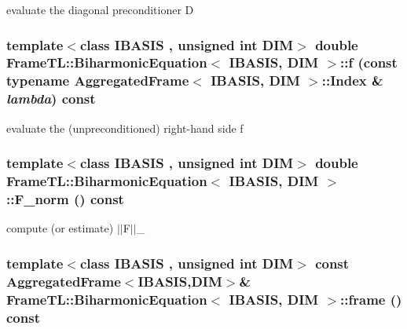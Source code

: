 evaluate the diagonal preconditioner D \hypertarget{classFrameTL_1_1BiharmonicEquation_0b477b96020f82cbccb11d904acbaf3e}{
\subsubsection[{f}]{\setlength{\rightskip}{0pt plus 5cm}template$<$class IBASIS , unsigned int DIM$>$ double {\bf FrameTL::BiharmonicEquation}$<$ IBASIS, DIM $>$::f (const typename {\bf AggregatedFrame}$<$ IBASIS, DIM $>$::{\bf Index} \& {\em lambda}) const}}
\label{classFrameTL_1_1BiharmonicEquation_0b477b96020f82cbccb11d904acbaf3e}


evaluate the (unpreconditioned) right-hand side f \hypertarget{classFrameTL_1_1BiharmonicEquation_8a83415dd882a4f51ceeaa46c988462f}{
\subsubsection[{F\_\-norm}]{\setlength{\rightskip}{0pt plus 5cm}template$<$class IBASIS , unsigned int DIM$>$ double {\bf FrameTL::BiharmonicEquation}$<$ IBASIS, DIM $>$::F\_\-norm () const}}
\label{classFrameTL_1_1BiharmonicEquation_8a83415dd882a4f51ceeaa46c988462f}


compute (or estimate) $|$$|$F$|$$|$\_ \hypertarget{classFrameTL_1_1BiharmonicEquation_4c9be93d423d6e61f61fa31b998d559d}{
\subsubsection[{frame}]{\setlength{\rightskip}{0pt plus 5cm}template$<$class IBASIS , unsigned int DIM$>$ const {\bf AggregatedFrame}$<$IBASIS,DIM$>$\& {\bf FrameTL::BiharmonicEquation}$<$ IBASIS, DIM $>$::frame () const}}
\label{classFrameTL_1_1BiharmonicEquation_4c9be93d423d6e61f61fa31b998d559d}


